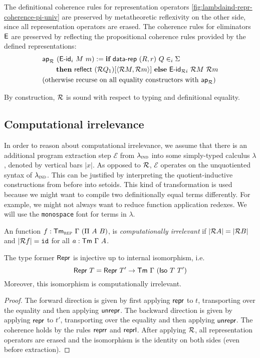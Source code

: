 The definitional coherence rules for representation operators
\cref{fig:lambdaind-repr-coherence-pi-univ} are preserved by metatheoretic
reflexivity on the other side, since all representation operators are erased.
The coherence rules for eliminators $\textsf{E}$ are preserved by reflecting the
propositional coherence rules provided by the defined representations:
\begin{align*}
& \mta{ap}_\R\ (\mta{E-id}_i\ M\ m) :=  \kwd{if}\ \mta{data-rep}\ (R, r)\ Q \in_i \Sigma\ \\
      &\qquad \kwd{then}\ \mta{reflect}\ (\R Q_1)[\Msub{\R M, \R m}]\ \kwd{else}\ \mta{E-id}_{\R i}\ \R M\ \R m  \\
& \text{(otherwise recurse on all equality constructors with $\mta{ap}_\R$)}
\end{align*}

By construction, $\mathcal{R}$ is sound with respect to typing and definitional equality.

\subsection{Computational irrelevance}

In order to reason about computational irrelevance, we assume that there is
an additional program extraction step $\mathcal{E}$ from $\lambda_{\textsc{ind}}$ into some
simply-typed calculus $\lambda$, denoted by vertical bars $|x|$. As opposed to
$\mathcal{R}$, $\mathcal{E}$ operates on the unquotiented syntax of $\lambda_{\textsc{ind}}$. This
can be justified by interpreting the quotient-inductive constructions from
before into setoids. This kind of
transformation is used because we might want to compile two definitionally equal
terms differently. For example, we might not always want to reduce function
application redexes. We will use the \texttt{monospace} font for terms in
$\lambda$.

\begin{definition}
    An function $f : \mta{Tm}_\rep\ \Gamma\ (\Pi\ A\ B)$, is \emph{computationally irrelevant} if
    $|\mathcal{R} A| = |\mathcal{R} B|$ and $|\mathcal{R} f| = \texttt{id}$ for all $a : \textsf{Tm}\ \Gamma\ A$.
\end{definition}

\begin{lemma}
	The type former $\textsf{Repr}{}$ is injective up to internal isomorphism, i.e.
	\begin{equation}
	\mta{Repr}\ T = \mta{Repr}\ T' \to \Tm\ \Gamma\ (\mta{Iso}\ T\ T')
	\end{equation}
	Moreover, this isomorphism is computationally irrelevant.
	\begin{proof}
	The forward direction is given by first applying $\textsf{repr}$ to $t$,
	transporting over the equality and then applying $\textsf{unrepr}$. The
	backward direction is given by applying $\textsf{repr}$ to $t'$, transporting
	over the equality and then applying $\textsf{unrepr}$. The coherence holds by
	the rules $\textsf{reprr}$ and $\textsf{reprl}$. After applying $\mathcal{R}$, all
	representation operators are erased and the isomorphism is the identity on both
	sides (even before extraction).
	\end{proof}
\end{lemma}


